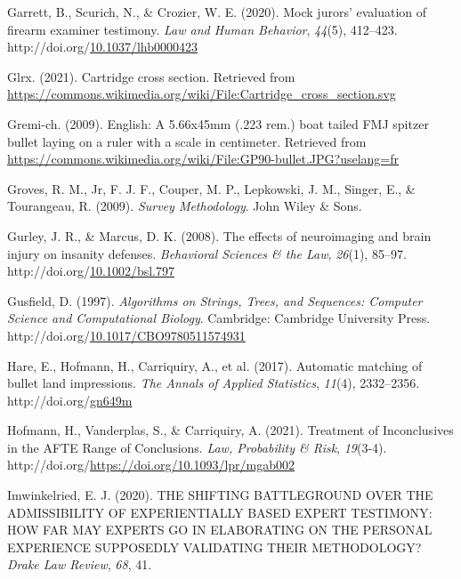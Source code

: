 \documentclass[print]{nuthesis}
\newlength{\cslhangindent}
\newenvironment{CSLReferences}[2]%
{\setlength{\parindent}{0pt}%
\everypar{\setlength{\hangindent}{\cslhangindent}}\ignorespaces}%
{\par}
\begin{document}
\begin{CSLReferences}{1}{0}
\leavevmode{}%
Garrett, B., Scurich, N., \& Crozier, W. E. (2020). Mock jurors' evaluation of firearm examiner testimony. \emph{Law and Human Behavior}, \emph{44}(5), 412--423. http://doi.org/\href{https://doi.org/10.1037/lhb0000423}{10.1037/lhb0000423}

\leavevmode{}%
Glrx. (2021). Cartridge cross section. Retrieved from \url{https://commons.wikimedia.org/wiki/File:Cartridge_cross_section.svg}

\leavevmode{}%
Gremi-ch. (2009). English: {A} 5.66x45mm (.223 rem.) boat tailed {FMJ} spitzer bullet laying on a ruler with a scale in centimeter. Retrieved from \url{https://commons.wikimedia.org/wiki/File:GP90-bullet.JPG?uselang=fr}

\leavevmode{}%
Groves, R. M., Jr, F. J. F., Couper, M. P., Lepkowski, J. M., Singer, E., \& Tourangeau, R. (2009). \emph{Survey {Methodology}}. John Wiley \& Sons.

\leavevmode{}%
Gurley, J. R., \& Marcus, D. K. (2008). The effects of neuroimaging and brain injury on insanity defenses. \emph{Behavioral Sciences \& the Law}, \emph{26}(1), 85--97. http://doi.org/\href{https://doi.org/10.1002/bsl.797}{10.1002/bsl.797}

\leavevmode{}%
Gusfield, D. (1997). \emph{Algorithms on {Strings}, {Trees}, and {Sequences}: {Computer} {Science} and {Computational} {Biology}}. Cambridge: Cambridge University Press. http://doi.org/\href{https://doi.org/10.1017/CBO9780511574931}{10.1017/CBO9780511574931}

\leavevmode{}%
Hare, E., Hofmann, H., Carriquiry, A., et al. (2017). Automatic matching of bullet land impressions. \emph{The Annals of Applied Statistics}, \emph{11}(4), 2332--2356. http://doi.org/\href{https://doi.org/gn649m}{gn649m}

\leavevmode{}%
Hofmann, H., Vanderplas, S., \& Carriquiry, A. (2021). Treatment of {Inconclusives} in the {AFTE} {Range} of {Conclusions}. \emph{Law, Probability \& Risk}, \emph{19}(3-4). http://doi.org/\url{https://doi.org/10.1093/lpr/mgab002}

\leavevmode{}%
Imwinkelried, E. J. (2020). {THE} {SHIFTING} {BATTLEGROUND} {OVER} {THE} {ADMISSIBILITY} {OF} {EXPERIENTIALLY} {BASED} {EXPERT} {TESTIMONY}: {HOW} {FAR} {MAY} {EXPERTS} {GO} {IN} {ELABORATING} {ON} {THE} {PERSONAL} {EXPERIENCE} {SUPPOSEDLY} {VALIDATING} {THEIR} {METHODOLOGY}? \emph{Drake Law Review}, \emph{68}, 41.


\end{CSLReferences}
\end{document}
